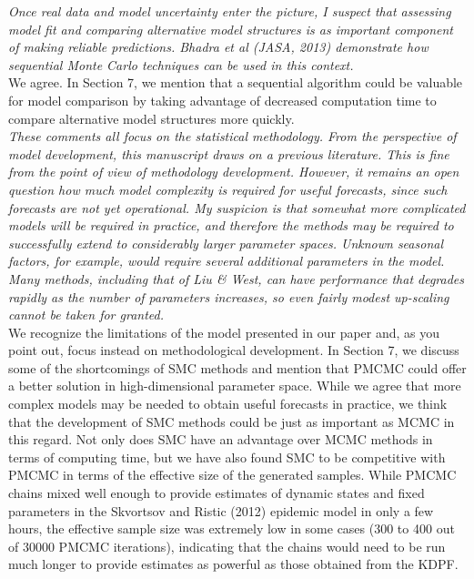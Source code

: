 \documentclass{article}
\begin{document}
\noindent \emph{Once real data and model uncertainty enter the picture, I suspect that assessing model fit and comparing alternative model structures is as important component of making reliable predictions. Bhadra et al (JASA, 2013) demonstrate how sequential Monte Carlo techniques can be used in this context.} \\

We agree. In Section 7, we mention that a sequential algorithm could be valuable for model comparison by taking advantage of decreased computation time to compare alternative model structures more quickly. \\

\noindent \emph{These comments all focus on the statistical methodology. From the perspective of model development, this manuscript draws on a previous literature. This is fine from the point of view of methodology development. However, it remains an open question how much model complexity is required for useful forecasts, since such forecasts are not yet operational. My suspicion is that somewhat more complicated models will be required in practice, and therefore the methods may be required to successfully extend to considerably larger parameter spaces. Unknown seasonal factors, for example, would require several additional parameters in the model. Many methods, including that of Liu \& West, can have performance that degrades rapidly as the number of parameters increases, so even fairly modest up-scaling cannot be taken for granted.} \\

We recognize the limitations of the model presented in our paper and, as you point out, focus instead on methodological development. In Section 7, we discuss some of the shortcomings of SMC methods and mention that PMCMC could offer a better solution in high-dimensional parameter space.  While we agree that more complex models may be needed to obtain useful forecasts in practice, we think that the development of SMC methods could be just as important as MCMC in this regard. Not only does SMC have an advantage over MCMC methods in terms of computing time, but we have also found SMC to be competitive with PMCMC in terms of the effective size of the generated samples. While PMCMC chains mixed well enough to provide estimates of dynamic states and fixed parameters in the Skvortsov and Ristic (2012) epidemic model in only a few hours, the effective sample size was extremely low in some cases (300 to 400 out of 30000 PMCMC iterations), indicating that the chains would need to be run much longer to provide estimates as powerful as those obtained from the KDPF. \\
\end{document}
